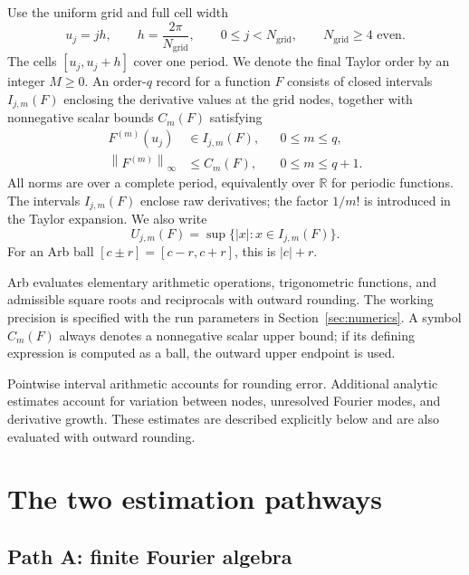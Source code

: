 \documentclass[11pt]{article}
\numberwithin{equation}{section}
\newcommand{\norm}[1]{\left\|#1\right\|_{\infty}}
\newcommand{\Ngrid}{N_{\mathrm{grid}}}
\begin{document}
Use the uniform grid and full cell width
\begin{equation}
 u_j=jh,\qquad h=\frac{2\pi}{\Ngrid},\qquad
 0\leq j<\Ngrid,\qquad \Ngrid\geq4\text{ even}.
 \label{eq:grid}
\end{equation}
The cells $[u_j,u_j+h]$ cover one period. We denote the final Taylor
order by an integer $M\geq0$.
An order-$q$ record for a function $F$ consists of closed intervals
$I_{j,m}(F)$ enclosing the derivative values at the grid nodes, together
with nonnegative scalar bounds $C_m(F)$ satisfying
\begin{equation}
 \begin{aligned}
 F^{(m)}(u_j)&\in I_{j,m}(F),&&0\leq m\leq q,\\
 \norm{F^{(m)}}&\leq C_m(F),&&0\leq m\leq q+1.
 \end{aligned}
 \label{eq:record}
\end{equation}
All norms are over a complete period, equivalently over $\mathbb R$ for
periodic functions. The intervals $I_{j,m}(F)$ enclose raw derivatives;
the factor $1/m!$ is introduced in the Taylor expansion. We also write
\begin{equation}
 U_{j,m}(F)=\sup\{|x|:x\in I_{j,m}(F)\}.
 \label{eq:U}
\end{equation}
For an Arb ball $[c\mathbin{\pm}r]=[c-r,c+r]$, this is $|c|+r$.

Arb evaluates elementary arithmetic operations, trigonometric functions,
and admissible square roots and reciprocals with outward rounding. The working precision is specified with the run
parameters in Section~\ref{sec:numerics}. A symbol
$C_m(F)$ always denotes a nonnegative scalar upper bound; if its defining
expression is computed as a ball, the outward upper endpoint is used.

Pointwise interval arithmetic accounts for rounding error. Additional
analytic estimates account for variation between nodes, unresolved Fourier
modes, and derivative growth. These estimates are described explicitly
below and are also evaluated with outward rounding.

\section{The two estimation pathways}
\label{sec:paths}

\subsection{Path A: finite Fourier algebra}
\label{sec:path-a}
\end{document}
